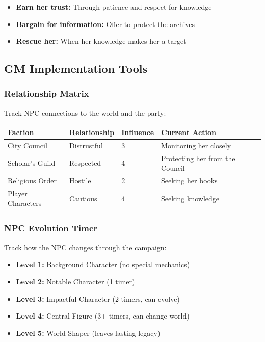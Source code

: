 \documentclass[10pt]{article}
\begin{document}
\begin{itemize}
  \item \textbf{Earn her trust:} Through patience and respect for knowledge
  \item \textbf{Bargain for information:} Offer to protect the archives
  \item \textbf{Rescue her:} When her knowledge makes her a target
\end{itemize}

\subsection{GM Implementation Tools}

\subsubsection{Relationship Matrix}

Track NPC connections to the world and the party:

\begin{center}
\begin{tabular}{|p{}|p{}|p{}|p{}|}
\hline
\textbf{Faction} & \textbf{Relationship} & \textbf{Influence} & \textbf{Current Action} \\ \hline
City Council & Distrustful & 3 & Monitoring her closely \\ \hline
Scholar's Guild & Respected & 4 & Protecting her from the Council \\ \hline
Religious Order & Hostile & 2 & Seeking her books \\ \hline
Player Characters & Cautious & 4 & Seeking knowledge \\ \hline
\end{tabular}
\end{center}

\subsubsection{NPC Evolution Timer }

Track how the NPC changes through the campaign:

\begin{itemize}
  \item \textbf{Level 1:} Background Character (no special mechanics)
  \item \textbf{Level 2:} Notable Character (1 timer)
  \item \textbf{Level 3:} Impactful Character (2 timers, can evolve)
  \item \textbf{Level 4:} Central Figure (3+ timers, can change world)
  \item \textbf{Level 5:} World-Shaper (leaves lasting legacy)
\end{itemize}
\end{document}
